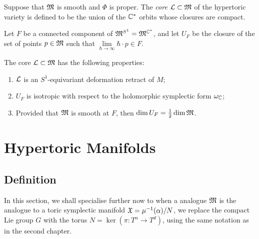 \begin{defn}
	Suppose that $\mathfrak{M}$ is smooth and $\Phi$ is proper. The \emph{core} $\mathcal{L} \subset \mathfrak{M}$ of the hypertoric variety is defined to be the union of the $\mathbb{C}^{\ast}$ orbits whose closures are compact.
\end{defn}

Let $F$ be a connected component of $\mathfrak{M}^{S^{1}} =  \mathfrak{M}^{\mathbb{C}^{\ast}}$, and let $U_{F}$ be the closure of the set of points $p \in \mathfrak{M}$ such that $\lim\limits_{\hbar \rightarrow \infty} \hbar \cdot p \in F$.

\begin{prop}
	The core $\mathcal{L} \subset \mathfrak{M}$ has the following properties:
	\begin{enumerate}
		\item $\mathcal{L}$ is an $S^{1}$-equivariant deformation retract of $M$;
		\item $U_{F}$ is isotropic with respect to the holomorphic symplectic form $\omega_{\mathbb{C}}$;
		\item Provided that $\mathfrak{M}$ is smooth at $F$, then $\dim U_{F} = \tfrac{1}{2}\dim \mathfrak{M}$.
	\end{enumerate}
\end{prop}

\section{Hypertoric Manifolds}

\subsection{Definition}

In this section, we shall specialise further now to when a \HK analogue $\mathfrak{M}$ is the analogue to a toric symplectic manifold $\mathfrak{X} = \mu^{-1}(\alpha)/N$, \ie we replace the compact Lie group $G$ with the torus $N = \ker(\pi:T^{n} \rightarrow T^{d})$, using the same notation as in the second chapter. 

